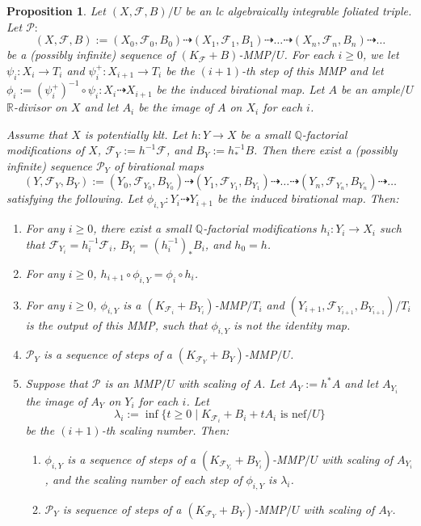 \documentclass[preprint,12pt]{elsarticle}
\newcommand{\Qq}{\mathbb{Q}}
\newcommand{\Rr}{\mathbb{R}}
\newcommand{\Ff}{\mathcal{F}}
\newtheorem{prop}[thm]{Proposition}
\begin{document}
\begin{prop}\label{prop: small lift mmp}
    Let $(X,\Ff,B)/U$ be an lc algebraically integrable foliated triple. Let $\mathcal{P}:$
$$(X,\Ff,B):=(X_0,\Ff_0,B_0)\dashrightarrow (X_1,\Ff_1,B_1)\dashrightarrow\dots\dashrightarrow (X_n,\Ff_n,B_n)\dashrightarrow\dots$$
be a (possibly infinite) sequence of $(K_{\Ff}+B)$-MMP$/U$. For each $i\geq 0$, we let $\psi_i: X_i\rightarrow T_i$ and $\psi_i^+:X_{i+1}\rightarrow T_{i}$ be the $(i+1)$-th step of this MMP and let $\phi_i:=(\psi_{i}^+)^{-1}\circ\psi_i: X_i\dashrightarrow X_{i+1}$ be the induced birational map. Let $A$ be an ample$/U$ $\Rr$-divisor on $X$ and let $A_i$ be the image of $A$ on $X_i$ for each $i$.

Assume that $X$ is potentially klt. Let $h: Y\rightarrow X$ be a small $\Qq$-factorial modifications of $X$, $\Ff_Y:=h^{-1}\Ff$, and $B_Y:=h^{-1}_*B$. Then there exist a (possibly infinite) sequence $\mathcal{P}_Y$ of birational maps 
$$(Y,\Ff_Y,B_Y):=(Y_0,\Ff_{Y_0},B_{Y_0})\dashrightarrow (Y_1,\Ff_{Y_1},B_{Y_1})\dashrightarrow\dots\dashrightarrow (Y_n,\Ff_{Y_n},B_{Y_n})\dashrightarrow\dots$$
satisfying the following. Let $\phi_{i,Y}: Y_i\dashrightarrow Y_{i+1}$ be the induced birational map. Then:
\begin{enumerate}
\item For any $i\geq 0$, there exist a small $\Qq$-factorial modifications $h_i: Y_i\rightarrow X_i$ such that $\Ff_{Y_i}=h_i^{-1}\Ff_i$, $B_{Y_i}=(h_i^{-1})_*B_i$, and $h_0=h$.
\item For any $i\geq 0$, $h_{i+1}\circ\phi_{i,Y}=\phi_i\circ h_i$.
\item For any $i\geq 0$, $\phi_{i,Y}$ is a $(K_{\Ff_i}+B_{Y_i})$-MMP$/T_i$ and $(Y_{i+1},\Ff_{Y_{i+1}},B_{Y_{i+1}})/T_i$ is the output of this MMP, such that $\phi_{i,Y}$ is not the identity map.
\item $\mathcal{P}_Y$ is a sequence of steps of a $(K_{\Ff_Y}+B_Y)$-MMP$/U$.
\item Suppose that $\mathcal{P}$ is an MMP$/U$ with scaling of $A$. Let $A_{Y}:=h^*A$ and let $A_{Y_i}$ the image of $A_Y$ on $Y_i$ for each $i$. Let
$$\lambda_i:=\inf\{t\geq 0\mid K_{\Ff_i}+B_i+tA_i\text{ is nef}/U\}$$
be the $(i+1)$-th scaling number. Then:
\begin{enumerate}
    \item $\phi_{i,Y}$ is a sequence of steps of a $(K_{\Ff_{Y_i}}+B_{Y_i})$-MMP$/U$ with scaling of $A_{Y_i}$, and the scaling number of each step of $\phi_{i,Y}$ is $\lambda_i$.
    \item $\mathcal{P}_Y$ is sequence of steps of a $(K_{\Ff_Y}+B_Y)$-MMP$/U$ with scaling of $A_Y$.
\end{enumerate}
\end{enumerate}
\end{prop}
\end{document}
